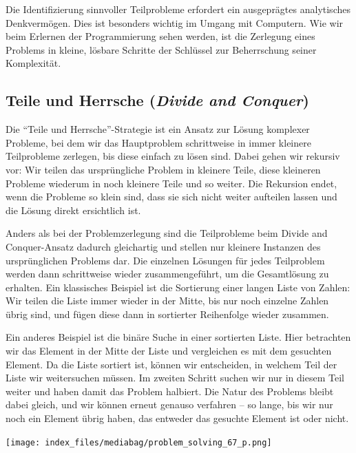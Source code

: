 \documentclass[
  letterpaper,
  DIV=11]{scrreprt}
\begin{document}
Die Identifizierung sinnvoller Teilprobleme erfordert ein ausgeprägtes
analytisches Denkvermögen. Dies ist besonders wichtig im Umgang mit
Computern. Wie wir beim Erlernen der Programmierung sehen werden, ist
die Zerlegung eines Problems in kleine, lösbare Schritte der Schlüssel
zur Beherrschung seiner Komplexität.

\subsection{\texorpdfstring{Teile und Herrsche (\emph{Divide and
Conquer})}{Teile und Herrsche (Divide and Conquer)}}\label{teile-und-herrsche-divide-and-conquer}

Die ``Teile und Herrsche''-Strategie ist ein Ansatz zur Lösung komplexer
Probleme, bei dem wir das Hauptproblem schrittweise in immer kleinere
Teilprobleme zerlegen, bis diese einfach zu lösen sind. Dabei gehen wir
rekursiv vor: Wir teilen das ursprüngliche Problem in kleinere Teile,
diese kleineren Probleme wiederum in noch kleinere Teile und so weiter.
Die Rekursion endet, wenn die Probleme so klein sind, dass sie sich
nicht weiter aufteilen lassen und die Lösung direkt ersichtlich ist.

Anders als bei der Problemzerlegung sind die Teilprobleme beim Divide
and Conquer-Ansatz dadurch gleichartig und stellen nur kleinere
Instanzen des ursprünglichen Problems dar. Die einzelnen Lösungen für
jedes Teilproblem werden dann schrittweise wieder zusammengeführt, um
die Gesamtlösung zu erhalten. Ein klassisches Beispiel ist die
Sortierung einer langen Liste von Zahlen: Wir teilen die Liste immer
wieder in der Mitte, bis nur noch einzelne Zahlen übrig sind, und fügen
diese dann in sortierter Reihenfolge wieder zusammen.

Ein anderes Beispiel ist die binäre Suche in einer sortierten Liste.
Hier betrachten wir das Element in der Mitte der Liste und vergleichen
es mit dem gesuchten Element. Da die Liste sortiert ist, können wir
entscheiden, in welchem Teil der Liste wir weitersuchen müssen. Im
zweiten Schritt suchen wir nur in diesem Teil weiter und haben damit das
Problem halbiert. Die Natur des Problems bleibt dabei gleich, und wir
können erneut genauso verfahren -- so lange, bis wir nur noch ein
Element übrig haben, das entweder das gesuchte Element ist oder nicht.

\begin{center}
\texttt{[image: index\_files/mediabag/problem\_solving\_67\_p.png]}
\end{center}
\end{document}

